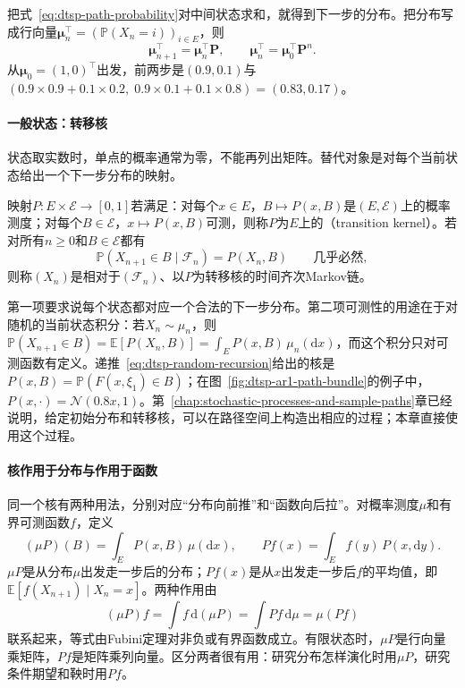 把式~\eqref{eq:dtsp-path-probability}对中间状态求和，就得到下一步的分布。把分布写成行向量$\bm\mu_n^{\top}=(\mathbb P(X_n=i))_{i\in E}$，则
\[
  \bm\mu_{n+1}^{\top}=\bm\mu_n^{\top}\bm P,\qquad
  \bm\mu_n^{\top}=\bm\mu_0^{\top}\bm P^n.
\]
从$\bm\mu_0=(1,0)^{\top}$出发，前两步是$(0.9,0.1)$与$(0.9\times0.9+0.1\times0.2,\;0.9\times0.1+0.1\times0.8)=(0.83,0.17)$。

\paragraph{一般状态：转移核}
状态取实数时，单点的概率通常为零，不能再列出矩阵。替代对象是对每个当前状态给出一个下一步分布的映射。

\begin{definition}[转移核]
  \label{def:dtsp-transition-kernel}
  映射$P:E\times\mathcal E\to[0,1]$若满足：对每个$x\in E$，$B\mapsto P(x,B)$是$(E,\mathcal E)$上的概率测度；对每个$B\in\mathcal E$，$x\mapsto P(x,B)$可测，则称$P$为$E$上的（transition kernel）。若对所有$n\geq0$和$B\in\mathcal E$都有
  \[
    \mathbb P(X_{n+1}\in B\mid\mathcal F_n)=P(X_n,B)\qquad\text{几乎必然},
  \]
  则称$(X_n)$是相对于$(\mathcal F_n)$、以$P$为转移核的时间齐次Markov链。
\end{definition}

第一项要求说每个状态都对应一个合法的下一步分布。第二项可测性的用途在于对随机的当前状态积分：若$X_n\sim\mu_n$，则
$\mathbb P(X_{n+1}\in B)=\mathbb E[P(X_n,B)]=\int_EP(x,B)\,\mu_n(\mathrm dx)$，而这个积分只对可测函数有定义。递推~\eqref{eq:dtsp-random-recursion}给出的核是$P(x,B)=\mathbb P(F(x,\xi_1)\in B)$；在图~\ref{fig:dtsp-ar1-path-bundle}的例子中，$P(x,\cdot)=\mathcal N(0.8x,1)$。第~\ref{chap:stochastic-processes-and-sample-paths}章已经说明，给定初始分布和转移核，可以在路径空间上构造出相应的过程；本章直接使用这个过程。

\paragraph{核作用于分布与作用于函数}
同一个核有两种用法，分别对应“分布向前推”和“函数向后拉”。对概率测度$\mu$和有界可测函数$f$，定义
\begin{equation}
  (\mu P)(B)=\int_E P(x,B)\,\mu(\mathrm dx),\qquad
  Pf(x)=\int_E f(y)\,P(x,\mathrm dy).
  \label{eq:dtsp-kernel-actions}
\end{equation}
$\mu P$是从分布$\mu$出发走一步后的分布；$Pf(x)$是从$x$出发走一步后$f$的平均值，即$\mathbb E[f(X_{n+1})\mid X_n=x]$。两种作用由
\[
  (\mu P)f=\int f\,\mathrm d(\mu P)=\int Pf\,\mathrm d\mu=\mu(Pf)
\]
联系起来，等式由Fubini定理对非负或有界函数成立。有限状态时，$\mu P$是行向量乘矩阵，$Pf$是矩阵乘列向量。区分两者很有用：研究分布怎样演化时用$\mu P$，研究条件期望和鞅时用$Pf$。

